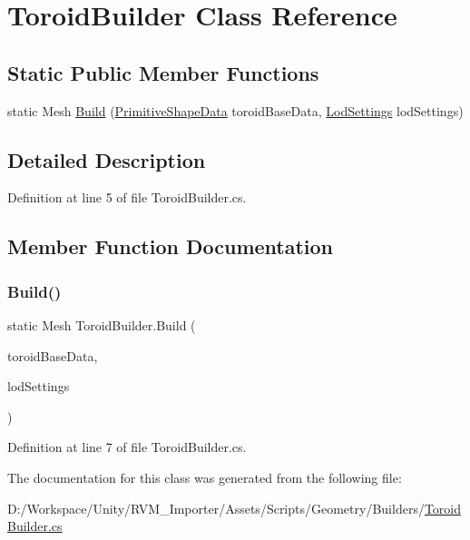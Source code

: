 \hypertarget{class_toroid_builder}{}\section{Toroid\+Builder Class Reference}
\label{class_toroid_builder}
\subsection*{Static Public Member Functions}
\begin{DoxyCompactItemize}
\item 
static Mesh \mbox{\hyperlink{class_toroid_builder_a7bf17e3933f6a8fd2da062cbd652f96e}{Build}} (\mbox{\hyperlink{class_primitive_shape_data}{Primitive\+Shape\+Data}} toroid\+Base\+Data, \mbox{\hyperlink{class_lod_settings}{Lod\+Settings}} lod\+Settings)
\end{DoxyCompactItemize}


\subsection{Detailed Description}


Definition at line 5 of file Toroid\+Builder.\+cs.



\subsection{Member Function Documentation}
\mbox{\label{class_toroid_builder_a7bf17e3933f6a8fd2da062cbd652f96e}} 
\subsubsection{\texorpdfstring{Build()}{Build()}}
{\footnotesize\ttfamily static Mesh Toroid\+Builder.\+Build (\begin{DoxyParamCaption}\item[{\mbox{\hyperlink{class_primitive_shape_data}{Primitive\+Shape\+Data}}}]{toroid\+Base\+Data,  }\item[{\mbox{\hyperlink{class_lod_settings}{Lod\+Settings}}}]{lod\+Settings }\end{DoxyParamCaption})\hspace{0.3cm}{\ttfamily [static]}}



Definition at line 7 of file Toroid\+Builder.\+cs.



The documentation for this class was generated from the following file\+:\begin{DoxyCompactItemize}
\item 
D\+:/\+Workspace/\+Unity/\+R\+V\+M\+\_\+\+Importer/\+Assets/\+Scripts/\+Geometry/\+Builders/\mbox{\hyperlink{_toroid_builder_8cs}{Toroid\+Builder.\+cs}}\end{DoxyCompactItemize}
